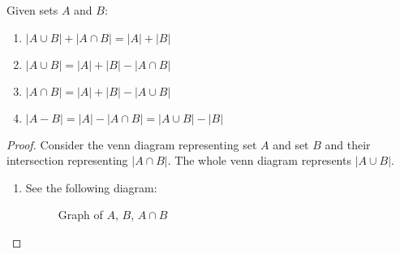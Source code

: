 \bigskip
\begin{proposition} Given sets \(A\) and \(B\):
    \begin{enumerate}
        \item \(|A\cup B|+|A\cap B|=|A|+|B|\)
        \item \(|A\cup B| = |A|+|B| - |A\cap B|\)
        \item \(|A\cap B| = |A|+|B| - |A\cup B|\)
        \item \(|A-B|= |A| - |A\cap B|= |A\cup B| - |B|\)
    \end{enumerate}
\end{proposition}
\newpage
\begin{proof} Consider the venn diagram representing set \(A\) and set \(B\) and their intersection representing \(|A\cap B|\). The whole venn diagram represents \(|A\cup B|\).
    \begin{enumerate}
        \item See the following diagram:
        \begin{figure}[H]
            \centering
            Graph of \(A\), \(B\), \(A\cap B\)


\end{figure}
\end{enumerate}
\end{proof}

